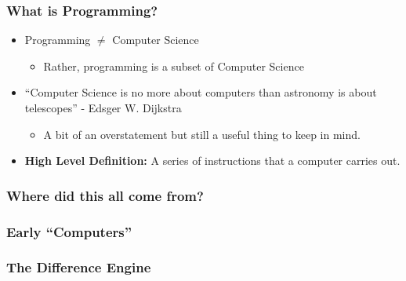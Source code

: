 \documentclass{beamer}
\begin{document}
%
%
\begin{frame}
  \frametitle{What is Programming?}
  \begin{minipage}{0.5\textwidth}
    \begin{itemize}
      \item Programming $\neq$ Computer Science
        \begin{itemize}
          \item Rather, programming is a subset of Computer Science
        \end{itemize}
      \pause
      \item ``Computer Science is no more about computers than astronomy is about telescopes'' - Edsger W. Dijkstra
        \begin{itemize}
          \item A bit of an overstatement but still a useful thing to keep in mind.
        \end{itemize}
      \pause
      \item \textbf{High Level Definition: } A series of instructions that a computer carries out.
    \end{itemize}
  \end{minipage}
  \begin{minipage}{0.5\textwidth}
  \end{minipage}
\end{frame}

%
%
\begin{frame}
  \frametitle{Where did this all come from?}
\end{frame}

%
%
\begin{frame}
  \frametitle{Early ``Computers''}
\end{frame}

%
%
\begin{frame}
  \frametitle{The Difference Engine}
\end{frame}
\end{document}
